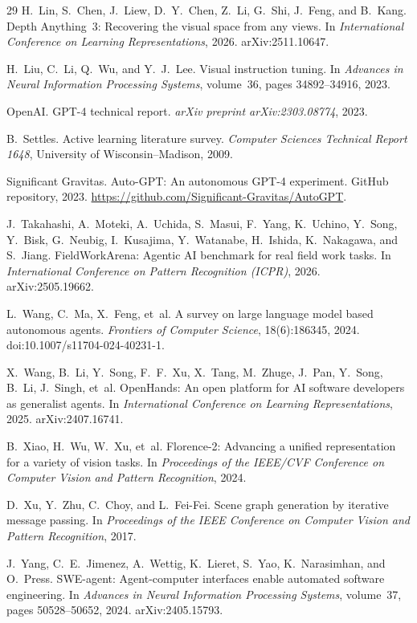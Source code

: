 \documentclass{article}
\begin{document}
\begin{thebibliography}{29}
H.~Lin, S.~Chen, J.~Liew, D.~Y.~Chen, Z.~Li, G.~Shi, J.~Feng, and B.~Kang. Depth Anything~3: Recovering the visual space from any views. In \emph{International Conference on Learning Representations}, 2026. arXiv:2511.10647.

H.~Liu, C.~Li, Q.~Wu, and Y.~J.~Lee. Visual instruction tuning. In \emph{Advances in Neural Information Processing Systems}, volume~36, pages 34892--34916, 2023.

OpenAI. GPT-4 technical report. \emph{arXiv preprint arXiv:2303.08774}, 2023.

B.~Settles. Active learning literature survey. \emph{Computer Sciences Technical Report 1648}, University of Wisconsin--Madison, 2009.

Significant Gravitas. Auto-GPT: An autonomous GPT-4 experiment. GitHub repository, 2023. \url{https://github.com/Significant-Gravitas/AutoGPT}.

J.~Takahashi, A.~Moteki, A.~Uchida, S.~Masui, F.~Yang, K.~Uchino, Y.~Song, Y.~Bisk, G.~Neubig, I.~Kusajima, Y.~Watanabe, H.~Ishida, K.~Nakagawa, and S.~Jiang. FieldWorkArena: Agentic AI benchmark for real field work tasks. In \emph{International Conference on Pattern Recognition (ICPR)}, 2026. arXiv:2505.19662.

L.~Wang, C.~Ma, X.~Feng, et~al. A survey on large language model based autonomous agents. \emph{Frontiers of Computer Science}, 18(6):186345, 2024. doi:10.1007/s11704-024-40231-1.

X.~Wang, B.~Li, Y.~Song, F.~F.~Xu, X.~Tang, M.~Zhuge, J.~Pan, Y.~Song, B.~Li, J.~Singh, et~al. OpenHands: An open platform for AI software developers as generalist agents. In \emph{International Conference on Learning Representations}, 2025. arXiv:2407.16741.

B.~Xiao, H.~Wu, W.~Xu, et~al. Florence-2: Advancing a unified representation for a variety of vision tasks. In \emph{Proceedings of the IEEE/CVF Conference on Computer Vision and Pattern Recognition}, 2024.

D.~Xu, Y.~Zhu, C.~Choy, and L.~Fei-Fei. Scene graph generation by iterative message passing. In \emph{Proceedings of the IEEE Conference on Computer Vision and Pattern Recognition}, 2017.

J.~Yang, C.~E.~Jimenez, A.~Wettig, K.~Lieret, S.~Yao, K.~Narasimhan, and O.~Press. SWE-agent: Agent-computer interfaces enable automated software engineering. In \emph{Advances in Neural Information Processing Systems}, volume~37, pages 50528--50652, 2024. arXiv:2405.15793.

\end{thebibliography}
\normalsize
\end{document}

